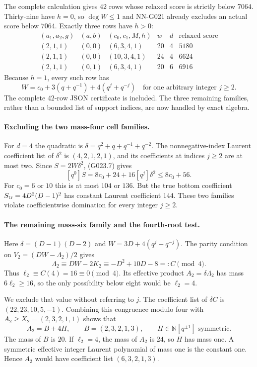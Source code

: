 The complete calculation gives $42$ rows whose relaxed
score is strictly below $7064$. Thirty-nine have $h=0$,
so $\deg W\le1$ and NN-G021 already excludes an actual
score below $7064$. Exactly three rows have $h>0$:
\[
 \begin{array}{c|c|c|c|c|c}
 (a_1,a_2,g)&(a,b)&(c_0,c_1,M,h)&w&d&
       \text{relaxed score}\\\hline
 (2,1,1)&(0,0)&(6,3,4,1)&20&4&5180\\
 (2,1,1)&(0,0)&(10,3,4,1)&24&4&6624\\
 (2,1,1)&(0,1)&(6,3,4,1)&20&6&6916
 \end{array}                                         \tag{G023.6}
\]
Because $h=1$, every such row has
\[
 W=c_0+3(q+q^{-1})+4(q^j+q^{-j})
 \quad\text{for one arbitrary integer }j\ge2.
 \tag{G023.7}
\]
The complete $42$-row JSON certificate is included. The
three remaining families, rather than a bounded list of
support indices, are now handled by exact algebra.

\paragraph{Excluding the two mass-four cell families.}
For $d=4$ the quadratic is
$\delta=q^2+q+q^{-1}+q^{-2}$. The nonnegative-index
Laurent coefficient list of $\delta^2$ is
$(4,2,1,2,1)$, and its coefficients at indices $j\ge2$
are at most two. Since $S=2W\delta^2$, (G023.7) gives
\[
 [q^0]S=8c_0+24+16[q^j]\delta^2\le8c_0+56.
\]
For $c_0=6$ or $10$ this is at most $104$ or $136$.
But the true bottom coefficient
$S_{\rm tr}=4D^2(D-1)^2$ has constant Laurent coefficient
$144$. These two families violate coefficientwise
domination for every integer $j\ge2$.

\paragraph{The remaining mass-six family and the fourth-root test.}
Here $\delta=(D-1)(D-2)$ and
$W=3D+4(q^j+q^{-j})$. The parity condition on
$V_2=(DW-\Lambda_2)/2$ gives
\[
 \Lambda_2\equiv DW-2K_2
  \equiv -D^2+10D-8=:C\pmod4.
 \tag{G023.8}
\]
Thus $\ell_2\equiv C(4)=16\equiv0\pmod4$.
Its effective product $A_2=\delta\Lambda_2$ has mass
$6\ell_2\ge16$, so the only possibility below eight
would be $\ell_2=4$.

We exclude that value without referring to $j$.
The coefficient list of $\delta C$ is
$(22,23,10,5,-1)$. Combining this congruence modulo four
with $A_2\ge X_2=(2,3,2,1,1)$ shows that
\[
 A_2=B+4H,\qquad
 B=(2,3,2,1,3),\qquad
 H\in\mathbb N[q^{\pm1}]\text{ symmetric}.
 \tag{G023.9}
\]
The mass of $B$ is $20$. If $\ell_2=4$, the mass of
$A_2$ is $24$, so $H$ has mass one. A symmetric effective
integer Laurent polynomial of mass one is the constant
one. Hence $A_2$ would have coefficient list
$(6,3,2,1,3)$.

